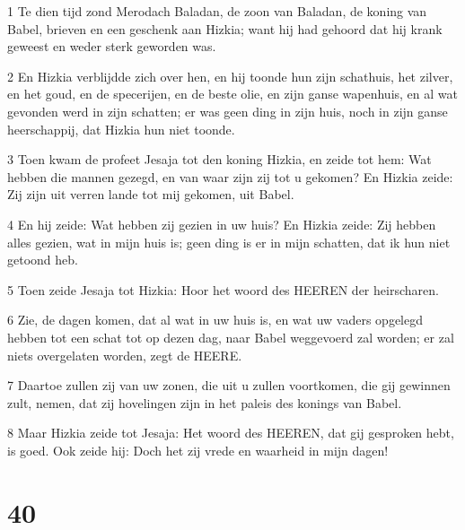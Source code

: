 \par 1 Te dien tijd zond Merodach Baladan, de zoon van Baladan, de koning van Babel, brieven en een geschenk aan Hizkia; want hij had gehoord dat hij krank geweest en weder sterk geworden was.
\par 2 En Hizkia verblijdde zich over hen, en hij toonde hun zijn schathuis, het zilver, en het goud, en de specerijen, en de beste olie, en zijn ganse wapenhuis, en al wat gevonden werd in zijn schatten; er was geen ding in zijn huis, noch in zijn ganse heerschappij, dat Hizkia hun niet toonde.
\par 3 Toen kwam de profeet Jesaja tot den koning Hizkia, en zeide tot hem: Wat hebben die mannen gezegd, en van waar zijn zij tot u gekomen? En Hizkia zeide: Zij zijn uit verren lande tot mij gekomen, uit Babel.
\par 4 En hij zeide: Wat hebben zij gezien in uw huis? En Hizkia zeide: Zij hebben alles gezien, wat in mijn huis is; geen ding is er in mijn schatten, dat ik hun niet getoond heb.
\par 5 Toen zeide Jesaja tot Hizkia: Hoor het woord des HEEREN der heirscharen.
\par 6 Zie, de dagen komen, dat al wat in uw huis is, en wat uw vaders opgelegd hebben tot een schat tot op dezen dag, naar Babel weggevoerd zal worden; er zal niets overgelaten worden, zegt de HEERE.
\par 7 Daartoe zullen zij van uw zonen, die uit u zullen voortkomen, die gij gewinnen zult, nemen, dat zij hovelingen zijn in het paleis des konings van Babel.
\par 8 Maar Hizkia zeide tot Jesaja: Het woord des HEEREN, dat gij gesproken hebt, is goed. Ook zeide hij: Doch het zij vrede en waarheid in mijn dagen!

\chapter{40}

